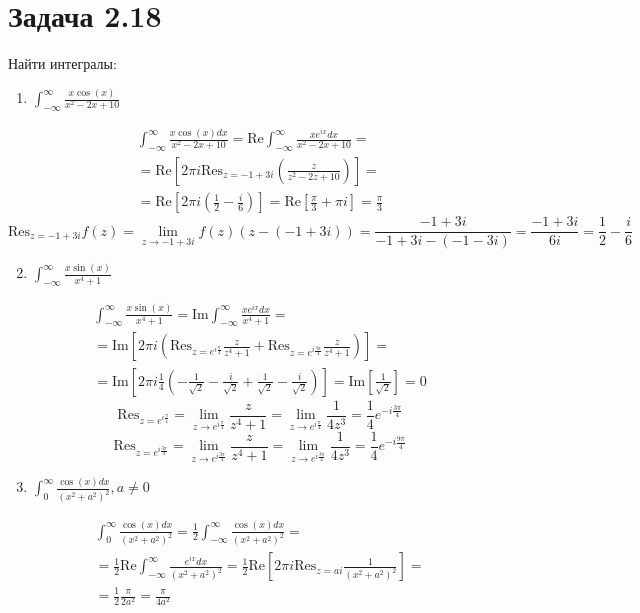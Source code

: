 \documentclass[11pt]{article}
\author{Sergey Makarov}
\date{\today}
\title{}
\begin{document}
\section{Задача 2.18}
\label{sec:org5c85840}
Найти интегралы:
\begin{enumerate}
\item \(\int_{-\infty}^\infty\frac{x\cos(x)}{x^2 - 2x + 10}\)
\end{enumerate}
\begin{multline*}
\int_{-\infty}^\infty\frac{x\cos(x)dx}{x^2 - 2x + 10} = \mathrm{Re}\int_{-\infty}^\infty\frac{xe^{ix}dx}{x^2-2x+10} = \\
= \mathrm{Re}\left[2\pi i \mathrm{Res}_{z=-1+3i}\left(\frac{z}{z^2-2z+10}\right)\right] = \\
= \mathrm{Re}\left[2\pi i(\frac{1}{2} - \frac{i}{6})\right] = \mathrm{Re}\left[\frac{\pi}{3} + \pi i\right] = \frac{\pi}{3}
\end{multline*}
$$\mathrm{Res}_{z=-1+3i}f(z) = \lim_{z \to -1 + 3i}f(z)(z - (-1 + 3i)) = \frac{-1 + 3i}{-1 + 3i - (-1 - 3i)} = \frac{-1 + 3i}{6i} = \frac{1}{2} - \frac{i}{6}$$
\begin{enumerate}
\setcounter{enumi}{1}
\item \(\int_{-\infty}^\infty\frac{x\sin(x)}{x^4 + 1}\)
\end{enumerate}
\begin{multline*}
\int_{-\infty}^\infty\frac{x\sin(x)}{x^4 + 1} = \mathrm{Im}\int_{-\infty}^\infty\frac{xe^{ix}dx}{x^4+1} = \\
= \mathrm{Im}\left[2\pi i\left(\mathrm{Res}_{z=e^{i\frac{\pi}{4}}}\frac{z}{z^4+1} + \mathrm{Res}_{z=e^{i\frac{3\pi}{4}}}\frac{z}{z^4+1}\right)\right] = \\
 = \mathrm{Im}\left[2\pi i\frac{1}{4}\left(-\frac{1}{\sqrt 2} - \frac{i}{\sqrt 2} + \frac{1}{\sqrt 2} - \frac{i}{\sqrt 2}\right)\right] = \mathrm{Im}\left[\frac{1}{\sqrt 2}\right] = 0
\end{multline*}
$$\mathrm{Res}_{z=e^{i\frac{\pi}{4}}} = \lim_{z \to e^{i\frac{\pi}{4}}}\frac{z}{z^4+1} = \lim_{z \to e^{i\frac{\pi}{4}}}\frac{1}{4z^3} = \frac{1}{4}e^{-i\frac{3\pi}{4}}$$
$$\mathrm{Res}_{z=e^{i\frac{3\pi}{4}}} = \lim_{z \to e^{i\frac{3\pi}{4}}}\frac{z}{z^4+1} = \lim_{z \to e^{i\frac{3\pi}{4}}}\frac{1}{4z^3} = \frac{1}{4}e^{-i\frac{9\pi}{4}}$$
\begin{enumerate}
\setcounter{enumi}{2}
\item \(\int_0^\infty\frac{\cos(x)dx}{(x^2+a^2)^2}, a \ne 0\)
\end{enumerate}
\begin{multline*}
\int_0^\infty\frac{\cos(x)dx}{(x^2+a^2)^2} = \frac{1}{2}\int_{-\infty}^\infty\frac{\cos(x)dx}{(x^2+a^2)^2} = \\
 = \frac{1}{2}\mathrm{Re}\int_{-\infty}^\infty\frac{e^{ix}dx}{(x^2+a^2)^2} = \frac{1}{2}\mathrm{Re}\left[2\pi i\mathrm{Res}_{z=ai}\frac{1}{(x^2+a^2)^2}\right] = \\
 = \frac{1}{2}\frac{\pi}{2a^2} = \frac{\pi}{4a^2}
\end{multline*}
\end{document}
